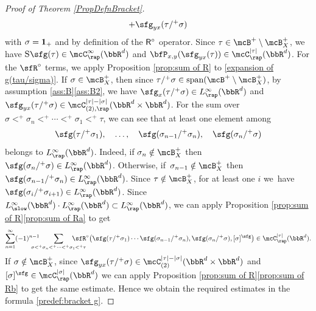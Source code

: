 \begin{proof}[Proof of Theorem \ref{PropDefnBracket}]
\begin{multline}
+\sfg_{yx}(\tau/^+\sigma)
\end{multline}
with $\sigma={\bf1}_+$ and by definition of the ${\sf R}^\circ$ operator. Since $\tau\in\mcB^+\setminus\mcB_X^+$, we have $\textsc{S}\sfg(\tau)\in \mcC_\rap^\infty(\bbR^d)$ and $\bfP_{x,y}(\sfg_{yx}(\tau))\in \mcC_\rap^{|\tau|}(\bbR^d)$. For the ${\sfR}^\circ$ terms, we apply Proposition \ref{prop:sum of R} to \eqref{expansion of g(tau/sigma)}. If $\sigma\in\mcB_X^+$, then since $\tau/^+\sigma\in\textrm{span}(\mcB^+\setminus\mcB_X^+)$, by assumption \ref{ass:B}\eqref{ass:B2}, we have $\sfg_x(\tau/^+\sigma)\in L_{\rap}^\infty(\bbR^d)$ and $\sfg_{yx}(\tau/^+\sigma)\in\mcC_{(2),\rap}^{|\tau|-|\sigma|}(\bbR^d\times\bbR^d)$. For the sum over $\sigma<^+\sigma_n<^+\cdots<^+\sigma_1<^+\tau$, we can see that at least one element among
\[
\sfg(\tau/^+\sigma_1),\quad \dots,\quad\sfg(\sigma_{n-1}/^+\sigma_n),\quad\sfg(\sigma_n/^+\sigma)
\]
belongs to $L_\rap^\infty(\bbR^d)$. Indeed, if $\sigma_n\notin\mcB_X^+$ then $\sfg(\sigma_n/^+\sigma)\in L_\rap^\infty(\bbR^d)$. Otherwise, if~$\sigma_{n-1}\notin\mcB_X^+$ then $\sfg(\sigma_{n-1}/^+\sigma_n)\in L_\rap^\infty(\bbR^d)$. Since $\tau\notin\mcB_X^+$, for at least one $i$ we~have $\sfg(\sigma_i/^+\sigma_{i+1})\in L_\rap^\infty(\bbR^d)$. Since $L_\slow^\infty(\bbR^d)\cdot L_\rap^\infty(\bbR^d)\subset L_\rap^\infty(\bbR^d)$, we can apply Proposition \ref{prop:sum of R}\eqref{prop:sum of Ra} to get
\[
\sum_{n=1}^\infty(-1)^{n-1}\hspace*{-5mm}\sum_{\sigma<^+\sigma_n<^+\cdots<^+\sigma_1<^+\tau}\hspace*{-8mm} \sfR^\circ\bigl(\sfg(\tau/^+\sigma_1)\cdots\sfg(\sigma_{n-1}/^+\sigma_n),\sfg(\sigma_n/^+\sigma),[\sigma]^\sfg\bigr)\in \mcC_\rap^{|\tau|}(\bbR^d).
\]
If $\sigma\notin\mcB_X^+$, since $\sfg_{yx}(\tau/^+\sigma)\in\mcC_{(2)}^{|\tau|-|\sigma|}(\bbR^d\times\bbR^d)$ and $[\sigma]^\sfg\in \mcC_\rap^{|\sigma|}(\bbR^d)$ we can apply Proposition \ref{prop:sum of R}\eqref{prop:sum of Rb} to get the same estimate. Hence we obtain the required estimates in the formula \eqref{predef:bracket g}.


\end{proof}
